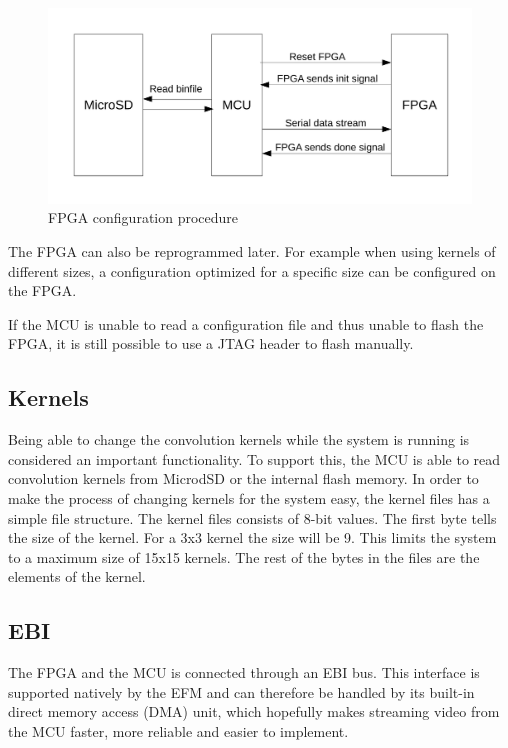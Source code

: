 \begin{figure}[h!]
    \includegraphics[width=\linewidth]{img/fpga_configuration.pdf}
    \caption{FPGA configuration procedure}
    \label{fig:fpgaConfiguration}
\end{figure}

The FPGA can also be reprogrammed later. For example when using kernels of different sizes, a configuration optimized for a specific size can be configured on the FPGA.

If the MCU is unable to read a configuration file and thus unable to flash the FPGA, it is still possible to use a JTAG header to flash manually.  

\subsection{Kernels}
Being able to change the convolution kernels while the system is running is considered an important functionality. To support this, the MCU is able to read convolution kernels from MicrodSD or the internal flash memory. 
In order to make the process of changing kernels for the system easy, the kernel files has a simple file structure. The kernel files consists of 8-bit values. The first byte tells the size of the kernel. For a 3x3 kernel the size will be 9. This limits the system to a maximum size of 15x15 kernels. The rest of the bytes in the files are the elements of the kernel.

\subsection{EBI}
The FPGA and the MCU is connected through an EBI bus.
This interface is supported natively by the EFM and can therefore be handled by its built-in direct memory access (DMA) unit, which hopefully makes streaming video from the MCU faster, more reliable and easier to implement.

